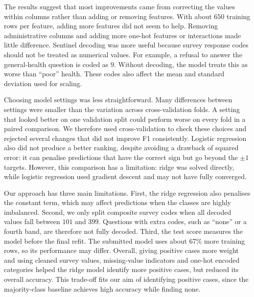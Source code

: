 \documentclass[10pt,conference,compsocconf]{IEEEtran}
\begin{document}
The results suggest that most improvements came from correcting the
values within columns rather than adding or removing features. With about
$650$ training rows per feature, adding more features did not seem to help.
Removing administrative columns and adding more one-hot features or
interactions made little difference. Sentinel decoding was more useful
because survey response codes should not be treated as numerical values.
For example, a refusal to answer the general-health question is coded as
$9$. Without decoding, the model treats this as worse than ``poor'' health.
These codes also affect the mean and standard deviation used for scaling.

Choosing model settings was less straightforward. Many differences between
settings were smaller than the variation across cross-validation folds.
A setting that looked better on one validation split could perform worse
on every fold in a paired comparison. We therefore used cross-validation
to check these choices and rejected several changes that did not improve F1 consistently. Logistic regression also did not
produce a better ranking, despite avoiding a drawback of squared error:
it can penalise predictions that have the correct sign but go beyond the
$\pm 1$ targets. However, this comparison has a limitation: ridge was solved
directly, while logistic regression used gradient descent and may not have
fully converged.

Our approach has three main limitations. First, the ridge regression
also penalises the constant term, which may affect predictions when the classes
are highly imbalanced. Second, we only split composite survey codes when
all decoded values fall between $101$ and $399$. Questions with extra codes,
such as ``none'' or a fourth band, are therefore not fully decoded.
Third, the test score measures the model before the final refit. The
submitted model uses about $67\%$ more training rows, so its performance
may differ. Overall, giving positive cases more weight and using cleaned survey values, missing-value indicators and one-hot encoded categories helped the ridge model identify more positive cases, but reduced its overall accuracy. This trade-off fits our aim of identifying positive cases,
since the majority-class baseline achieves high accuracy while finding
none.
\end{document}

